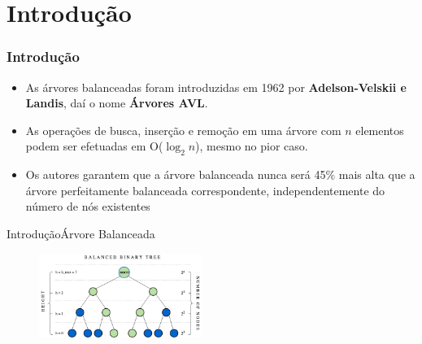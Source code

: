 \documentclass[aspectratio=169]{beamer}
\begin{document}
% 
%     
%     
%   
\section{Introdução} %

\begin{frame}
\frametitle{Introdução}
\begin{itemize}
 \item As árvores balanceadas foram introduzidas em 1962 por {\bf Adelson-Velskii e Landis}, daí o nome {\bf Árvores AVL}.
 \item As operações de busca, inserção e remoção em uma árvore com $n$ elementos podem ser efetuadas em O($\log_2n$), mesmo no pior caso.
 \item Os autores garantem que a árvore balanceada nunca será 45\% mais alta que a árvore perfeitamente balanceada correspondente, independentemente do número de nós existentes
\end{itemize}
\end{frame}


\begin{frame}{Introdução}{Árvore Balanceada}
\begin{figure}[!h]
  \centering
   \includegraphics[width=150pt]{imagens/balanced_tree.png}
  \label{fig_balanced_tree}
\end{figure}
\end{frame}


\end{document}
